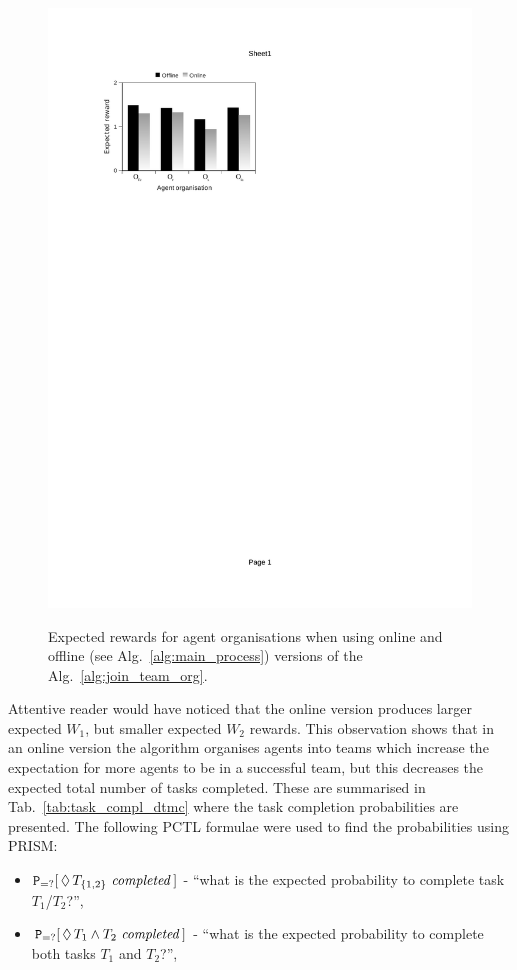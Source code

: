 \documentclass{llncs}
\begin{document}
\begin{figure}[H]
{{  \includegraphics[clip=true, trim=70 579 300 90, scale=0.77]{images/w2_dtmc}
}}
\caption{Expected rewards for agent organisations when using online and offline (see Alg.~\ref{alg:main_process}) versions of the Alg.~\ref{alg:join_team_org}.}
\label{fig:bar_chart_dtmc}
\end{figure}
\vspace{-6mm}


Attentive reader would have noticed that the online version produces larger expected $W_1$, but smaller expected $W_2$ rewards. This observation shows that in an online version the algorithm organises agents into teams which increase the expectation for more agents to be in a successful team, but this decreases the expected total number of tasks completed. These are summarised in Tab.~\ref{tab:task_compl_dtmc} where the task completion probabilities are presented. The following PCTL formulae were used to find the probabilities using PRISM:
\begin{itemize}
 \item ${\tt P}_{=?}[\,\Diamond\,T_{\{1,2\}} \mathit{\ completed}\,]$ -
``what is the expected probability to complete  task $T_1$/$T_2$?'',
 \item ${\tt P}_{=?}[\,\Diamond\,T_{1} \wedge T_2 \mathit{\ completed}\,]$ -
``what is the expected probability to complete  both tasks $T_1$ and $T_2$?'',
\end{itemize}
\end{document}
